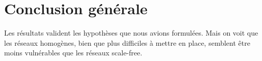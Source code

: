 \documentclass[11pt,a4paper]{article}
\begin{document}
\section{Conclusion générale} %

	Les résultats valident les hypothèses que nous avions formulées. Mais on voit que les réseaux homogènes, bien que plus difficiles à mettre en place, semblent être moins vulnérables que les réseaux scale-free. 




%
%
%
%
%
%
%
%
%
%
%
%
%
%
\end{document}
